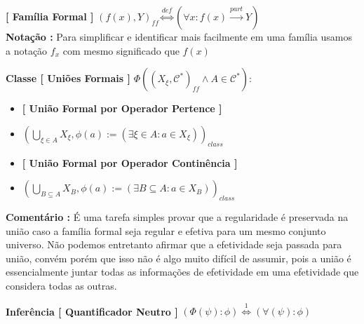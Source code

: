 \documentclass[10pt,a4paper]{report}
\begin{document}

\hspace{\baselineskip}

\textbf{[ Família Formal ]} $ (f(x), Y)_{ff} \overset{def}{\iff} (\forall x : f(x) \overset{part}{\rightarrow} Y )$\\

\textbf{Notação :} Para simplificar e identificar mais facilmente em uma família usamos a notação $ f_x $ com mesmo significado que $f(x)$

\hspace{\baselineskip}

\textbf{Classe [ Uniões Formais ]} $ \Phi( (X_{\xi} , \mathcal{C}^*)_{ff} \wedge A \in \mathcal{C}^* ) : $

\begin{itemize}
	\item[ (i) ] \textbf{[ União Formal por Operador Pertence ]} 
	\item[ ]$ \left( \bigcup\limits_{ \xi \in A } X_{\xi}  , \phi(a) :=( \exists \xi \in A : a \in X_{\xi} ) \right)_{class}  $
	\item[ (ii) ] \textbf{[ União Formal por Operador Continência ]} 
	\item[ ] $ \left( \bigcup\limits_{ B \subseteq A } X_B  , \phi(a) := ( \exists B \subseteq A : a \in  X_B ) \right)_{class}  $ 
\end{itemize}

\textbf{Comentário :} É uma tarefa simples provar que a regularidade é preservada na união caso a família formal seja regular e efetiva para um mesmo conjunto universo. Não podemos entretanto afirmar que a efetividade seja passada para união, convém porém que isso não é algo muito difícil de assumir, pois a união é essencialmente juntar todas as informações de efetividade em uma efetividade que considera todas as outras.

\hspace{\baselineskip}

\textbf{Inferência [ Quantificador Neutro ]} $ ( \Phi(\psi) : \phi ) \overset{1}{\iff} ( \forall (\psi) : \phi ) $\\
\end{document}
